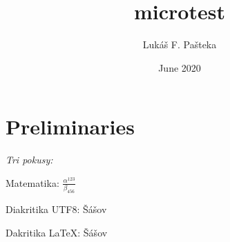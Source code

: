 \documentclass{article}
\title{microtest}
\author{Lukáš F. Pašteka}
\date{June 2020}
\begin{document}
\maketitle

\section{Preliminaries}

\textit{Tri pokusy:}

Matematika: $\frac{\alpha^{123}}{\beta_{456}}$

Diakritika UTF8: Šášov

Dakritika LaTeX: \v{S}\'a\v{s}ov
\end{document}

